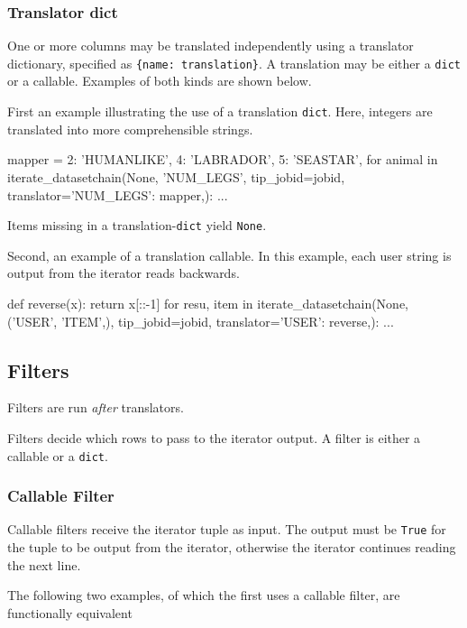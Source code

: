 \subsubsection*{Translator dict}

One or more columns may be translated independently using a translator
dictionary, specified as \texttt{\{name:\ translation\}}.  A
translation may be either a \texttt{dict} or a callable.  Examples of
both kinds are shown below.

First an example illustrating the use of a translation \texttt{dict}.
Here, integers are translated into more comprehensible strings.

\begin{python}
mapper = {2: 'HUMANLIKE', 4: 'LABRADOR', 5: 'SEASTAR',}
for animal in iterate_datasetchain(None, 'NUM_LEGS', tip_jobid=jobid,
                                     translator={'NUM_LEGS': mapper,}):
    ...
\end{python}
\noindent Items missing in a translation-\texttt{dict} yield
\texttt{None}.

Second, an example of a translation callable.  In this example, each
user string is output from the iterator reads backwards.

\begin{python}
def reverse(x):
    return x[::-1]
for resu, item in iterate_datasetchain(None, ('USER', 'ITEM',), tip_jobid=jobid,
                                       translator={'USER': reverse,}):
    ...
\end{python}



\newpage
\subsection{Filters}

Filters are run \emph{after} translators.

Filters decide which rows to pass to the iterator output.  A filter is
either a callable or a \texttt{dict}.


\subsubsection*{Callable Filter}

Callable filters receive the iterator tuple as input.  The output must
be \texttt{True} for the tuple to be output from the iterator,
otherwise the iterator continues reading the next line.

The following two examples, of which the first uses a callable filter,
are functionally equivalent


